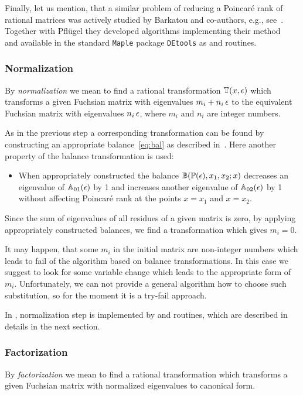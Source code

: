 \documentclass[12pt,a4paper]{article}
\def\M#1{\mathbb{#1}} %
\begin{document}
Finally, let us mention, that a similar problem of reducing a Poincar\'e rank of rational matrices was actively studied by Barkatou and co-authors, e.g., see~\cite{BP99}.
Together with Pfl\"ugel they developed algorithms implementing their method~\cite{BP99} and available in the standard \texttt{Maple} package \texttt{DEtools} as  and  routines.


\subsubsection{Normalization}
\label{sec:norm}

By {\em normalization} we mean to find a rational transformation $\M T(x,\eps)$ which transforms a given Fuchsian matrix with eigenvalues $m_i + n_i \, \epsilon$ to the equivalent Fuchsian matrix with eigenvalues $n_i \, \epsilon$, where $m_i$ and $n_i$ are integer numbers.

As in the previous step a corresponding transformation can be found by constructing an appropriate balance~\eqref{eq:bal} as described in~\cite[p.~11]{Lee15}.
Here another property of the balance transformation is used:
\begin{itemize}
  \item When appropriately constructed the balance $\M B(\M P(\eps), x_1, x_2; x)$ decreases an eigenvalue of $\M A_{01}(\eps)$ by 1 and increases another eigenvalue of $\M A_{02}(\eps)$ by 1 without affecting Poincar\'e rank at the points $x=x_1$ and $x=x_2$.
\end{itemize}
Since the sum of eigenvalues of all residues of a given matrix is zero, by applying appropriately constructed balances, we find a transformation which gives $m_i = 0$.

It may happen, that some $m_i$ in the initial matrix are non-integer numbers which leads to fail of the algorithm based on balance transformations.
In this case we suggest to look for some variable change which leads to the appropriate form of $m_i$.
Unfortunately, we can not provide a general algorithm how to choose such substitution, so for the moment it is a try-fail approach.

In \fuchsia, normalization step is implemented by  and  routines, which are described in details in the next section.


\subsubsection{Factorization}
\label{sec:fact}
By {\em factorization} we mean to find a rational transformation which transforms a given Fuchsian matrix with normalized eigenvalues to canonical form.
\end{document}
